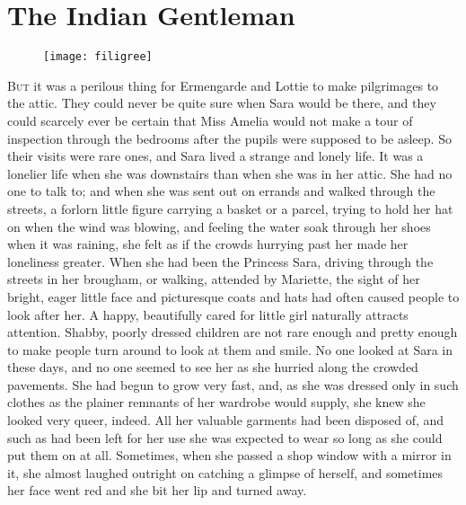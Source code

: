 \chapter{The Indian Gentleman}

\begin{figure}[t!]
\centering
\texttt{[image: filigree]}
\end{figure}

\lettrine[lines=5]{B}{ut} it was a perilous thing for Ermengarde and Lottie to make pilgrimages to the attic. They could never be quite sure when Sara would be there, and they could scarcely ever be certain that Miss Amelia would not make a tour of inspection through the bedrooms after the pupils were supposed to be asleep. So their visits were rare ones, and Sara lived a strange and lonely life. It was a lonelier life when she was downstairs than when she was in her attic. She had no one to talk to; and when she was sent out on errands and walked through the streets, a forlorn little figure carrying a basket or a parcel, trying to hold her hat on when the wind was blowing, and feeling the water soak through her shoes when it was raining, she felt as if the crowds hurrying past her made her loneliness greater. When she had been the Princess Sara, driving through the streets in her brougham, or walking, attended by Mariette, the sight of her bright, eager little face and picturesque coats and hats had often caused people to look after her. A happy, beautifully cared for little girl naturally attracts attention. Shabby, poorly dressed children are not rare enough and pretty enough to make people turn around to look at them and smile. No one looked at Sara in these days, and no one seemed to see her as she hurried along the crowded pavements. She had begun to grow very fast, and, as she was dressed only in such clothes as the plainer remnants of her wardrobe would supply, she knew she looked very queer, indeed. All her valuable garments had been disposed of, and such as had been left for her use she was expected to wear so long as she could put them on at all. Sometimes, when she passed a shop window with a mirror in it, she almost laughed outright on catching a glimpse of herself, and sometimes her face went red and she bit her lip and turned away.


